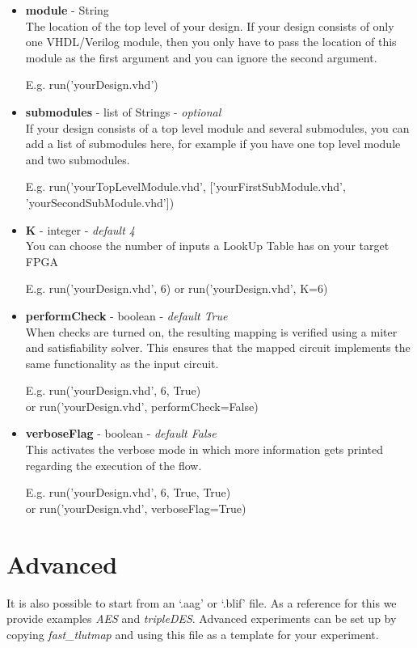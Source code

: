 \documentclass[a4paper,oneside]{memoir}
\begin{document}
\begin{itemize}
\item \textbf{module} - String\\
The location of the top level of your design. If your design consists of only one VHDL/Verilog module, then you only have to pass the location of this module as the first argument and you can ignore the second argument.

E.g. run('yourDesign.vhd')

\item \textbf{submodules} - list of Strings - \textit{optional}\\
If your design consists of a top level module and several submodules, you can add a list of submodules here, for example if you have one top level module and two submodules.

E.g. run('yourTopLevelModule.vhd', ['yourFirstSubModule.vhd', 'yourSecondSubModule.vhd'])

\item \textbf{K} - integer - \textit{default 4}\\
You can choose the number of inputs a LookUp Table has on your target FPGA

E.g. run('yourDesign.vhd', 6)
or run('yourDesign.vhd', K=6)

\item \textbf{performCheck} - boolean - \textit{default True}\\
When checks are turned on, the resulting mapping is verified using a miter and satisfiability solver. This ensures that the mapped circuit implements the same functionality as the input circuit.

E.g. run('yourDesign.vhd', 6, True)\\
or run('yourDesign.vhd', performCheck=False)

\item \textbf{verboseFlag} - boolean - \textit{default False}\\
This activates the verbose mode in which more information gets printed regarding the execution of the flow.

E.g. run('yourDesign.vhd', 6, True, True)\\ or run('yourDesign.vhd', verboseFlag=True)
\end{itemize}


\section{Advanced}
It is also possible to start from an `.aag' or `.blif' file. As a reference for this we provide examples \emph{AES} and \emph{tripleDES}. 
Advanced experiments can be set up by copying \emph{fast\_tlutmap} and using this file as a template for your experiment.
\end{document}
